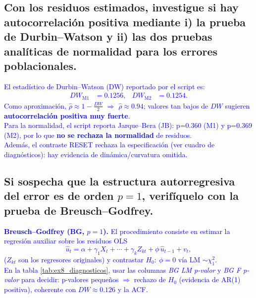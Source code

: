 \documentclass[10pt]{article}
\begin{document}
\subsection{Con los residuos estimados, investigue si hay autocorrelación positiva mediante i) la prueba de Durbin--Watson y ii) las dos pruebas analíticas de normalidad para los errores poblacionales.}
\textcolor{blue}{
El estadístico de Durbin–Watson (DW) reportado por el script es:
\begin{align*}
DW_{\text{M1}}&=0.1256, & DW_{\text{M2}}&=0.1254.
\end{align*}
Como aproximación, $\hat\rho\approx 1-\tfrac{DW}{2}$ $\Rightarrow$ $\hat\rho\approx 0.94$; valores tan bajos de $DW$ sugieren \textbf{autocorrelación positiva muy fuerte}.\\
Para la normalidad, el script reporta Jarque–Bera (JB): p=0.360 (M1) y p=0.369 (M2), por lo que \textbf{no se rechaza la normalidad} de residuos.\\
Además, el contraste RESET rechaza la especificación (ver cuadro de diagnósticos): hay evidencia de dinámica/curvatura omitida.

}
\subsection{Si sospecha que la estructura autorregresiva del error es de orden \texorpdfstring{$p=1$}{p=1}, verifíquelo con la prueba de Breusch--Godfrey.}
    \textcolor{blue}{
        \textbf{Breusch--Godfrey (BG, $p=1$).} El procedimiento consiste en estimar la regresión auxiliar sobre los residuos OLS
        \begin{equation*}
        \hat u_t = \alpha + \gamma_1 X_t + \cdots + \gamma_k Z_{kt} + \phi\,\hat u_{t-1} + v_t,
        \end{equation*}
        (\(Z_{kt}\) son los regresores originales) y contrastar $H_0\!:\ \phi=0$ vía LM $\sim\chi^2_1$.\\[4pt]
        En la tabla \ref{tab:ex8_diagnosticos}, usar las columnas \emph{BG LM p-valor} y \emph{BG F p-valor} para decidir: p-valores pequeños $\Rightarrow$ rechazo de $H_0$ (evidencia de AR(1) positiva), coherente con $DW\approx0.126$ y la ACF.
    }
\end{document}
